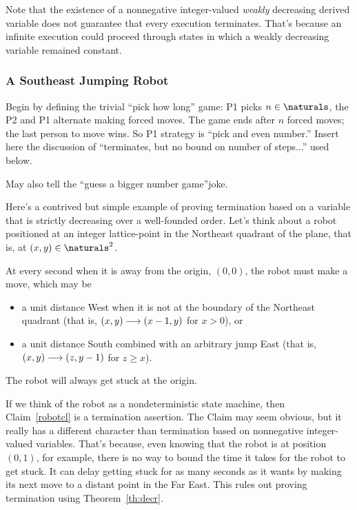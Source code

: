 \begin{editingnotes}
Note that the existence of a nonnegative integer-valued \emph{weakly}
decreasing derived variable does not guarantee that every execution
terminates.  That's because an infinite execution could proceed through
states in which a weakly decreasing variable remained constant.

\subsubsection{A Southeast Jumping Robot}

\begin{editingnotes}Begin by defining the trivial ``pick how long'' game: P1 picks $n
\in \naturals$, the P2 and P1 alternate making forced moves.  The game
ends after $n$ forced moves; the last person to move wins.  So P1 strategy
is ``pick and even number.''  Insert here the discussion of ``terminates,
but no bound on number of steps...'' used below.

May also tell the ``guess a bigger number game''joke.
\end{editingnotes}

Here's a contrived but simple example of proving termination based on a
variable that is strictly decreasing over a well-founded order.  Let's
think about a robot positioned at an integer lattice-point in the
Northeast quadrant of the plane, that is, at $(x,y) \in \naturals^2$.

At every second when it is away from the origin, $(0,0)$, the robot must
make a move, which may be
\begin{itemize}

\item a unit distance West when it is not at the boundary of the Northeast
  quadrant (that is, $(x,y) \mathrel{\longrightarrow} (x-1,y)$ for $x>0$), or

\item a unit distance South combined with an arbitrary jump East (that is,
     $(x,y) \mathrel{\longrightarrow} (z,y-1)$ for $z\geq x$).

\end{itemize}
\begin{claim}\label{robotcl}
The robot will always get stuck at the origin.
\end{claim}

If we think of the robot as a nondeterministic state machine, then
Claim~\ref{robotcl} is a termination assertion.  The Claim may seem
obvious, but it really has a different character than termination based on
nonnegative integer-valued variables.  That's because, even knowing that
the robot is at position $(0,1)$, for example, there is no way to bound
the time it takes for the robot to get stuck.  It can delay getting stuck
for as many seconds as it wants by making its next move to a distant point
in the Far East.  This rules out proving termination using
Theorem~\ref{th:decr}.


\end{editingnotes}
